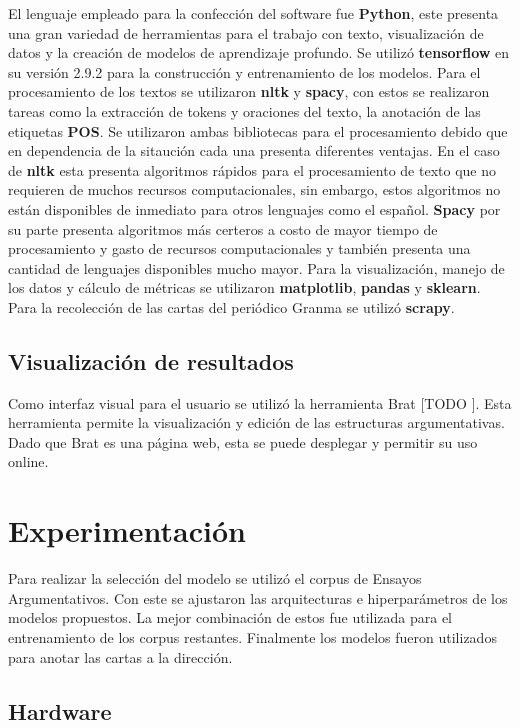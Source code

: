 El lenguaje empleado para la confección del software fue \textbf{Python}, este presenta una gran variedad de herramientas 
para el trabajo con texto, visualización de datos y la creación de modelos de aprendizaje profundo.
Se utilizó \textbf{tensorflow} en su versión 2.9.2 para la construcción y entrenamiento de los modelos. 
Para el procesamiento de los textos se utilizaron \textbf{nltk} y \textbf{spacy}, con estos se realizaron tareas
como la extracción de tokens y oraciones del texto, la anotación de las etiquetas \textbf{POS}. Se utilizaron 
ambas bibliotecas para el procesamiento debido que en dependencia de la sitaución cada una presenta diferentes
ventajas. En el caso de \textbf{nltk} esta presenta algoritmos rápidos para el procesamiento de texto que no 
requieren de muchos recursos computacionales, sin embargo, estos algoritmos no están disponibles de inmediato
para otros lenguajes como el español. \textbf{Spacy} por su parte presenta algoritmos más certeros a costo 
de mayor tiempo de procesamiento y gasto de recursos computacionales y también presenta una cantidad de lenguajes 
disponibles mucho mayor. Para la visualización, manejo de los datos y cálculo de métricas se utilizaron 
\textbf{matplotlib}, \textbf{pandas} y \textbf{sklearn}. Para la recolección de las cartas del periódico 
Granma se utilizó \textbf{scrapy}.

\subsection{Visualización de resultados}

Como interfaz visual para el usuario se utilizó la herramienta Brat [TODO \cite{}]. Esta herramienta permite
la visualización y edición de las estructuras argumentativas. Dado que Brat es una página web, esta se puede
desplegar y permitir su uso online.  

\section{Experimentación}

Para realizar la selección del modelo se utilizó el corpus de Ensayos Argumentativos. Con este se ajustaron
las arquitecturas e hiperparámetros de los modelos propuestos. La mejor combinación de estos fue utilizada para el entrenamiento de
los corpus restantes. Finalmente los modelos fueron utilizados para anotar las cartas a la dirección. 

\subsection{Hardware}

